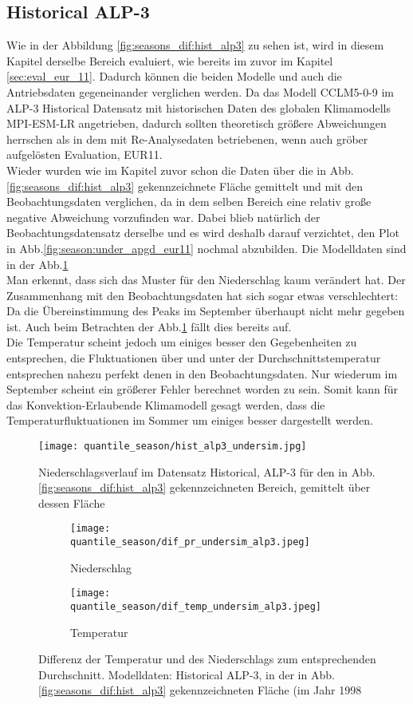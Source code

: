 \subsection{Historical ALP-3}
Wie in der Abbildung \ref{fig:seasons_dif:hist_alp3} zu sehen ist, wird in diesem Kapitel derselbe Bereich evaluiert, wie bereits im zuvor im Kapitel \ref{sec:eval_eur_11}. Dadurch können die beiden Modelle und auch die Antriebsdaten gegeneinander verglichen werden. Da das Modell CCLM5-0-9 im ALP-3 Historical Datensatz mit historischen Daten des globalen Klimamodells MPI-ESM-LR angetrieben, dadurch sollten theoretisch größere Abweichungen herrschen als in dem mit Re-Analysedaten betriebenen, wenn auch gröber aufgelösten Evaluation, EUR11.\\
Wieder wurden wie im Kapitel zuvor schon die Daten über die in Abb.\ref{fig:seasons_dif:hist_alp3} gekennzeichnete Fläche gemittelt und mit den Beobachtungsdaten verglichen, da in dem selben Bereich eine relativ große negative Abweichung vorzufinden war. Dabei blieb natürlich der Beobachtungsdatensatz derselbe und es wird deshalb darauf verzichtet, den Plot in Abb.\ref{fig:season:under_apgd_eur11} nochmal abzubilden. Die Modelldaten sind in der Abb.\ref{fig:season:under_hist_alp3}\\
Man erkennt, dass sich das Muster für den Niederschlag kaum verändert hat. Der Zusammenhang mit den Beobachtungsdaten hat sich sogar etwas verschlechtert: Da die Übereinstimmung des Peaks im September überhaupt nicht mehr gegeben ist. Auch beim Betrachten der Abb.\ref{fig:season:under_hist_alp3} fällt dies bereits auf.\\
Die Temperatur scheint jedoch um einiges besser den Gegebenheiten zu entsprechen, die Fluktuationen über und unter der Durchschnittstemperatur entsprechen nahezu perfekt denen in den Beobachtungsdaten. Nur wiederum im September scheint ein größerer Fehler berechnet worden zu sein. Somit kann für das Konvektion-Erlaubende Klimamodell gesagt werden, dass die Temperaturfluktuationen im Sommer um einiges besser dargestellt werden.
\begin{figure}[h]
	\texttt{[image: quantile\_season/hist\_alp3\_undersim.jpg]}
	\caption{Niederschlagsverlauf im Datensatz Historical, ALP-3 für den in Abb.\ref{fig:seasons_dif:hist_alp3} gekennzeichneten Bereich, gemittelt über dessen Fläche}
	\label{fig:season:under_hist_alp3}
\end{figure}
\begin{figure}[h]
	\begin{subfigure}{0.49\textwidth}
		\texttt{[image: quantile\_season/dif\_pr\_undersim\_alp3.jpeg]}
		\caption{Niederschlag}
	\end{subfigure}
	\begin{subfigure}{0.49\textwidth}
		\texttt{[image: quantile\_season/dif\_temp\_undersim\_alp3.jpeg]}
		\caption{Temperatur}
	\end{subfigure}
	\caption{Differenz der Temperatur und des Niederschlags zum entsprechenden Durchschnitt. Modelldaten: Historical ALP-3, in der in Abb.\ref{fig:seasons_dif:hist_alp3} gekennzeichneten Fläche (im Jahr 1998}
	\label{fig:seasons:mean_alp3}
\end{figure}
\newpage
